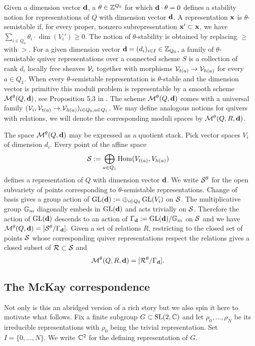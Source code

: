 \documentclass{amsart}
\theoremstyle{definition}
\begin{document}
Given a dimension vector $\mathbf{d}$, a $\theta \in \mathbb{Z}^{Q_0}$ for which $\mathbf{d} \cdot \theta=0$ defines a stability notion for representations of $Q$ with dimension vector $\mathbf{d}$.
A representation $\mathbf{x}$ is $\theta$-semistable if, for every proper, nonzero subrepresentation $\mathbf{x}' \subset \mathbf{x}$, we have $\sum_{i \in Q_0} \theta_i \cdot \dim(V_i') \geq 0$.  
The notion of $\theta$-stability is obtained by replacing $\geq$ with $>$. 
For a given dimension vector $\mathbf{d} =(d_i)_{i \in I} \in \mathbb{Z}_{Q_0}$, a family of $\theta$-semistable quiver representations over a connected scheme $S$ is a collection of rank $d_i$ locally free sheaves $\mathcal{V}_i$ together with morphisms $\mathcal{V}_{t(a)} \rightarrow \mathcal{V}_{h(a)}$ for every $a\in Q_1$. 
When every $\theta$-semistable representation is $\theta$-stable and the dimension vector is primitive this moduli problem is representable by a smooth scheme $\mathcal{M}^\theta(Q, \mathbf{d})$, see Proposition 5.3 in \cite{Ki}.
The scheme $\mathcal{M}^\theta(Q, \mathbf{d})$ comes with a universal family $(\mathcal{V}_i, \mathcal{V}_{t(a)} \rightarrow \mathcal{V}_{h(a)})_{i \in Q_0, a \in Q_1}$. 
We may define analogous notions for quivers with relations, we will denote the corresponding moduli spaces by $\mathcal{M}^\theta(Q,R,\mathbf{d})$.

The space $\mathcal{M}^\theta(Q, \mathbf{d})$ may be expressed as a quotient stack.
Pick vector spaces $V_i$ of dimension $d_i$.
Every point of the affine space
$$\mathcal{S}:= \bigoplus_{a \in Q_1} \operatorname{Hom}(V_{t(a)}, V_{h(a)})$$
defines a representation of $Q$ with dimension vector $\mathbf{d}$.
We write $\mathcal{S}^\theta$ for the open subvariety of points corresponding to $\theta$-semistable representations.
Change of basis gives a group action of $\operatorname{GL}(\mathbf{d}):= \oplus_{i \in Q_0} \operatorname{GL}(V_i)$ on $\mathcal{S}$.
The multiplicative group $\mathbb{G}_m$ diagonally embeds in $\operatorname{GL}(\mathbf{d})$ and acts trivially on $\mathcal{S}$.
Therefore the action of $\operatorname{GL}(\mathbf{d})$ descends to an action of $\Gamma_{\mathbf{d}}:= \operatorname{GL}(\mathbf{d})/\mathbb{G}_m$ on $\mathcal{S}$ and we have $\mathcal{M}^\theta(Q, \mathbf{d}) = [\mathcal{S}^\theta / \Gamma_{\mathbf{d}}].$
Given a set of relations $R$, restricting to the closed set of points $\mathcal{S}$ whose corresponding quiver representations respect the relations gives a closed subset of $\mathcal{R} \subset \mathcal{S}$ and $$\mathcal{M}^\theta(Q,R,\mathbf{d})= [\mathcal{R}^\theta/\Gamma_{\mathbf{d}}].$$

\subsection{The McKay correspondence}\label{ssc:McKay}
Not only is this an abridged version of a rich story but we also spin it here to motivate what follows.
Fix a finite subgroup $G \subset \operatorname{SL}(2,\mathbb{C})$ and let $\rho_0, \ldots, \rho_N$ be its
irreducible representations with $\rho_0$ being the trivial representation.
Set $I=\{0,\ldots,N\}$.
We write $\mathbb{C}^2$ for the defining representation of $G$.
\end{document}

